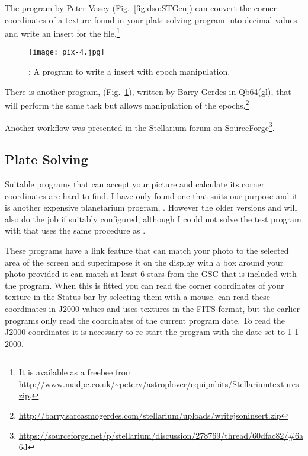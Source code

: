 The program  by Peter Vasey (Fig.~\ref{fig:dso:STGen}) can convert the corner coordinates of a
texture found in your plate solving program into decimal values and write an
insert for the  file.\footnote{It is available as a freebee
from
\url{http://www.madpc.co.uk/~peterv/astroplover/equipnbits/Stellariumtextures.zip}.}

\begin{figure}[t]
\centering\texttt{[image: pix-4.jpg]}
\caption{: A program to write a  insert with epoch manipulation.}
\label{fig:dso:ReadDSS}
\end{figure}

There is another program,  (Fig.~\ref{fig:dso:ReadDSS}), written by Barry Gerdes in Qb64(gl), that will perform the same
task but allows manipulation of the epochs.\footnote{
\url{http://barry.sarcasmogerdes.com/stellarium/uploads/writejsoninsert.zip}}

Another workflow was presented in the Stellarium forum on
SourceForge\footnote{\url{https://sourceforge.net/p/stellarium/discussion/278769/thread/60dfac82/#6a6d}}.

\subsection{Plate Solving}%
\label{sec:dso:plateSolving}

Suitable programs that can accept your picture and calculate its corner
coordinates are hard to find. I have only found one that suits our
purpose and it is another expensive planetarium program, .
However the older versions  and  will also do the job if
suitably configured, although I could not solve the test program with 
 that uses the same procedure as .

These programs have a link feature that can match your photo to the
selected area of the screen and superimpose it on the display with a box
around your photo provided it can match at least 6 stars from the GSC
that is included with the program. When this is fitted you can read the
corner coordinates of your texture in the Status bar by selecting them
with a mouse.  can read these coordinates in J2000 values and
uses textures in the FITS format, but the earlier programs only read the
coordinates of the current program date. To read the J2000 coordinates
it is necessary to re-start the program with the date set to 1-1-2000.

